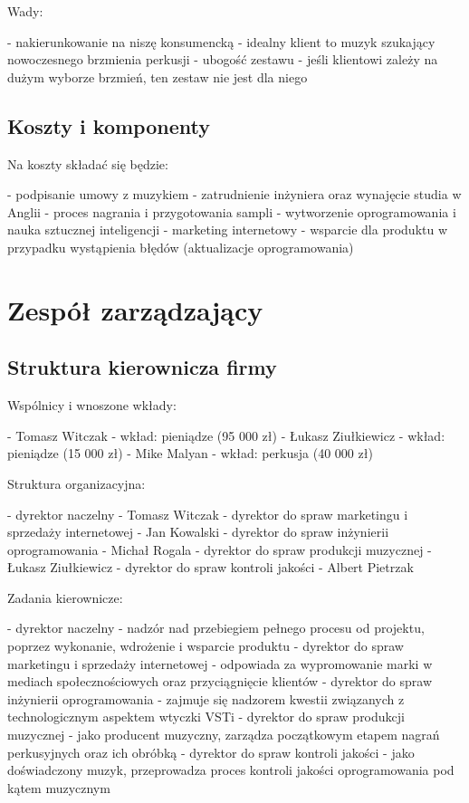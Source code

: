 \documentclass[12pt]{article}
\begin{document}
Wady:

- nakierunkowanie na niszę konsumencką - idealny klient to muzyk szukający
  nowoczesnego brzmienia perkusji
- ubogość zestawu - jeśli klientowi zależy na dużym wyborze brzmień, ten zestaw
  nie jest dla niego

\subsection{Koszty i komponenty}

Na koszty składać się będzie:

- podpisanie umowy z muzykiem
- zatrudnienie inżyniera oraz wynajęcie studia w Anglii
- proces nagrania i przygotowania sampli
- wytworzenie oprogramowania i nauka sztucznej inteligencji
- marketing internetowy
- wsparcie dla produktu w przypadku wystąpienia błędów (aktualizacje
  oprogramowania)

\section{Zespół zarządzający}


\subsection{Struktura kierownicza firmy}

Wspólnicy i wnoszone wkłady:

- Tomasz Witczak - wkład: pieniądze (95 000 zł)
- Łukasz Ziułkiewicz - wkład: pieniądze (15 000 zł)
- Mike Malyan - wkład: perkusja (40 000 zł)

Struktura organizacyjna:

- dyrektor naczelny - Tomasz Witczak
- dyrektor do spraw marketingu i sprzedaży internetowej - Jan Kowalski
- dyrektor do spraw inżynierii oprogramowania - Michał Rogala
- dyrektor do spraw produkcji muzycznej - Łukasz Ziułkiewicz
- dyrektor do spraw kontroli jakości - Albert Pietrzak

Zadania kierownicze:

- dyrektor naczelny - nadzór nad przebiegiem pełnego procesu od projektu,
  poprzez wykonanie, wdrożenie i wsparcie produktu
- dyrektor do spraw marketingu i sprzedaży internetowej - odpowiada za
  wypromowanie marki w mediach społecznościowych oraz przyciągnięcie klientów
- dyrektor do spraw inżynierii oprogramowania - zajmuje się nadzorem kwestii
  związanych z technologicznym aspektem wtyczki VSTi
- dyrektor do spraw produkcji muzycznej - jako producent muzyczny, zarządza
  początkowym etapem nagrań perkusyjnych oraz ich obróbką
- dyrektor do spraw kontroli jakości - jako doświadczony muzyk, przeprowadza
  proces kontroli jakości oprogramowania pod kątem muzycznym
\end{document}
